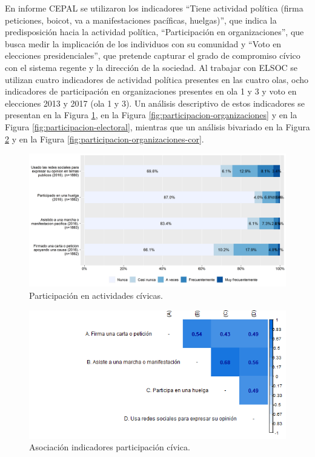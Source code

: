\documentclass[
  12pt,
]{book}
\begin{document}
En informe CEPAL se utilizaron los indicadores ``Tiene actividad política (firma peticiones, boicot, va a manifestaciones pacíficas, huelgas)'', que indica la predisposición hacia la actividad política, ``Participación en organizaciones'', que busca medir la implicación de los individuos con su comunidad y ``Voto en elecciones presidenciales'', que pretende capturar el grado de compromiso cívico con el sistema regente y la dirección de la sociedad. Al trabajar con ELSOC se utilizan cuatro indicadores de actividad política presentes en las cuatro olas, ocho indicadores de participación en organizaciones presentes en ola 1 y 3 y voto en elecciones 2013 y 2017 (ola 1 y 3). Un análisis descriptivo de estos indicadores se presentan en la Figura \ref{fig:participacion-civica}, en la Figura \ref{fig:participacion-organizaciones} y en la Figura \ref{fig:participacion-electoral}, mientras que un análisis bivariado en la Figura \ref{fig:participacion-civica-cor} y en la Figura \ref{fig:participacion-organizaciones-cor}.

\begin{figure}[H]

{\centering \includegraphics[width=1\linewidth,height=1\textheight]{output/graphs/participacion-civica} 

}

\caption{Participación en actividades cívicas.}\label{fig:participacion-civica}
\end{figure}

\begin{figure}[H]

{\centering \includegraphics[width=1\linewidth,height=1\textheight]{output/graphs/participacion-civica_cor} 

}

\caption{Asociación indicadores participación cívica.}\label{fig:participacion-civica-cor}
\end{figure}
\end{document}

